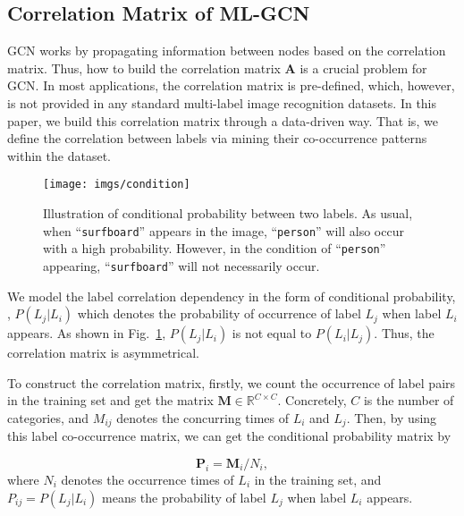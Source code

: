 \documentclass[10pt,twocolumn,letterpaper]{article}
\begin{document}
\subsection{Correlation Matrix of ML-GCN}\label{sec:cormat}

GCN works by propagating information between nodes based on the correlation matrix. Thus, how to build the correlation matrix $\bm{A}$ is a crucial problem for GCN. In most applications, the correlation matrix is pre-defined, which, however, is not provided in any standard multi-label image recognition datasets. In this paper, we build this correlation matrix through a data-driven way. That is, we define the correlation between labels via mining their co-occurrence patterns within the dataset. 

\begin{figure}[t!]
	\centering
	\texttt{[image: imgs/condition]}
	\caption{Illustration of conditional probability between two labels. As usual, when ``\texttt{surfboard}'' appears in the image, ``\texttt{person}'' will also occur with a high probability. However, in the condition of ``\texttt{person}'' appearing, ``\texttt{surfboard}'' will not necessarily occur.}
	\label{fig:condition}
\end{figure}



We model the label correlation dependency in the form of conditional probability, \ie, $P(L_{j}|L_{i})$ which denotes the probability of occurrence of label $L_{j}$ when label $L_{i}$ appears. As shown in Fig.~\ref{fig:condition}, $P(L_{j}|L_{i})$ is not equal to $P(L_{i}|L_{j})$. Thus, the correlation matrix is asymmetrical. 

To construct the correlation matrix, firstly, we count the occurrence of label pairs in the training set and get the matrix $\bm{M}\in\mathbb{R}^{C\times{C}}$. Concretely, $C$ is the number of categories, and $M_{ij}$ denotes the concurring times of $L_{i}$ and $L_{j}$. Then, by using this label co-occurrence matrix, we can get the conditional probability matrix by 

\begin{equation}
	\bm{P}_{i} = \bm{M}_{i} / N_{i},
\end{equation}
where $N_{i}$ denotes the occurrence times of $L_i$ in the training set, and $P_{ij} = P(L_{j}|L_{i})$ means the probability of label $L_j$ when label $L_i$ appears.
\end{document}
